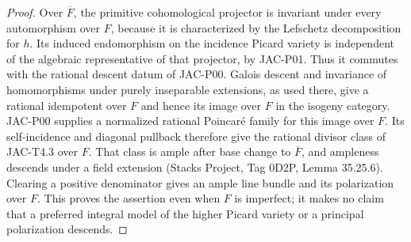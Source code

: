 \begin{proof}
Over $\overline F$, the primitive cohomological projector is invariant
under every automorphism over $F$, because it is characterized by the
Lefschetz decomposition for $h$. Its induced endomorphism on the
incidence Picard variety is independent of the algebraic representative
of that projector, by JAC-P01. Thus it commutes with the rational
descent datum of JAC-P00. Galois descent and invariance of homomorphisms
under purely inseparable extensions, as used there, give a rational
idempotent over $F$ and hence its image over $F$ in the isogeny category.
JAC-P00 supplies a normalized rational Poincar\'e family for this image
over $F$. Its self-incidence and diagonal pullback therefore give the
rational divisor class of JAC-T4.3 over $F$. That class is ample after
base change to $\overline F$, and ampleness descends under a field
extension (Stacks Project, Tag 0D2P, Lemma 35.25.6).
Clearing a positive denominator gives an ample line bundle
and its polarization over $F$. This proves the assertion even when
$F$ is imperfect; it makes no claim that a preferred integral model of
the higher Picard variety or a principal polarization descends.
\end{proof}
